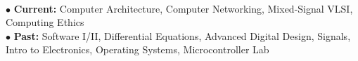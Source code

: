 \documentclass[10pt]{article}
\begin{document}
\\
$\bullet$ {\bf Current:} Computer Architecture, Computer Networking, Mixed-Signal VLSI, Computing Ethics\\
$\bullet$ {\bf Past:} Software I/II, Differential Equations, Advanced Digital Design, Signals, Intro to Electronics, Operating Systems, Microcontroller Lab\\
\end{document}
